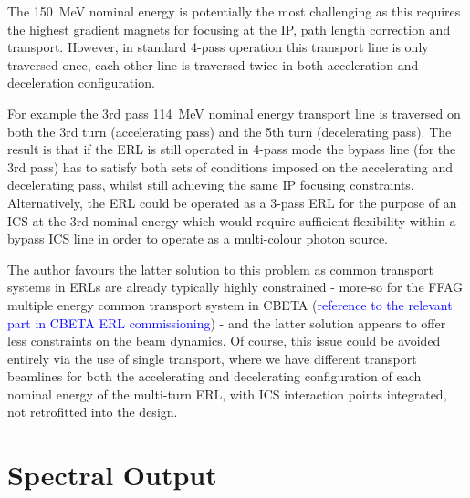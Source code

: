 \documentclass[../main.tex]{subfiles}
\begin{document}
The 150~\si{\mega\electronvolt} nominal energy is potentially the most challenging as this requires the highest gradient magnets for focusing at the IP, path length correction and transport. However, in standard 4-pass operation this transport line is only traversed once, each other line is traversed twice in both acceleration and deceleration configuration.

For example the 3rd pass 114~\si{\mega\electronvolt} nominal energy transport line is traversed on both the 3rd turn (accelerating pass) and the 5th turn (decelerating pass). The result is that if the ERL is still operated in 4-pass mode the bypass line (for the 3rd pass) has to satisfy both sets of conditions imposed on the accelerating and decelerating pass, whilst still achieving the same IP focusing constraints. Alternatively, the ERL could be operated as a 3-pass ERL for the purpose of an ICS at the 3rd nominal energy which would require sufficient flexibility within a bypass ICS line in order to operate as a multi-colour photon source.

The author favours the latter solution to this problem as common transport systems in ERLs are already typically highly constrained - more-so for the FFAG multiple energy common transport system in CBETA  (\textcolor{blue}{reference to the relevant part in CBETA ERL commissioning}) - and the latter solution appears to offer less constraints on the beam dynamics. Of course, this issue could be avoided entirely via the use of single transport, where we have different transport beamlines for both the accelerating and decelerating configuration of each nominal energy of the multi-turn ERL, with ICS interaction points integrated, not retrofitted into the design.     

\section{Spectral Output}
\end{document}
